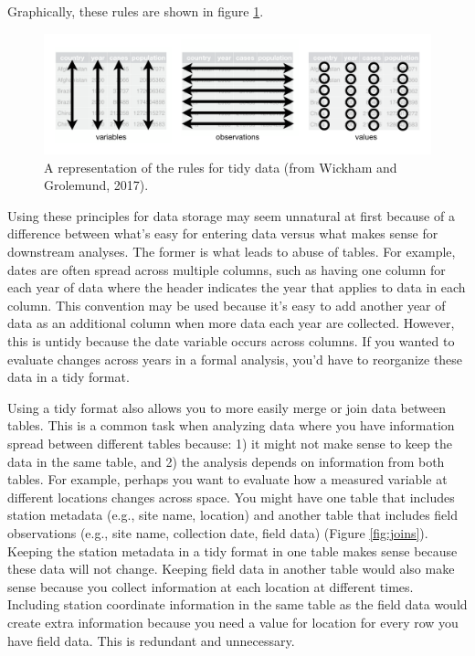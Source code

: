 \documentclass[
]{book}
\begin{document}
Graphically, these rules are shown in figure \ref{fig:tidy}.

\begin{figure}

{\centering \includegraphics[width=1\linewidth]{img/tidy-1} 

}

\caption{A representation of the rules for tidy data (from Wickham and Grolemund, 2017).}\label{fig:tidy}
\end{figure}

Using these principles for data storage may seem unnatural at first because of a difference between what's easy for entering data versus what makes sense for downstream analyses. The former is what leads to abuse of tables. For example, dates are often spread across multiple columns, such as having one column for each year of data where the header indicates the year that applies to data in each column. This convention may be used because it's easy to add another year of data as an additional column when more data each year are collected. However, this is untidy because the date variable occurs across columns. If you wanted to evaluate changes across years in a formal analysis, you'd have to reorganize these data in a tidy format.

Using a tidy format also allows you to more easily merge or join data between tables. This is a common task when analyzing data where you have information spread between different tables because: 1) it might not make sense to keep the data in the same table, and 2) the analysis depends on information from both tables. For example, perhaps you want to evaluate how a measured variable at different locations changes across space. You might have one table that includes station metadata (e.g., site name, location) and another table that includes field observations (e.g., site name, collection date, field data) (Figure \ref{fig:joins}). Keeping the station metadata in a tidy format in one table makes sense because these data will not change. Keeping field data in another table would also make sense because you collect information at each location at different times. Including station coordinate information in the same table as the field data would create extra information because you need a value for location for every row you have field data. This is redundant and unnecessary.
\end{document}
